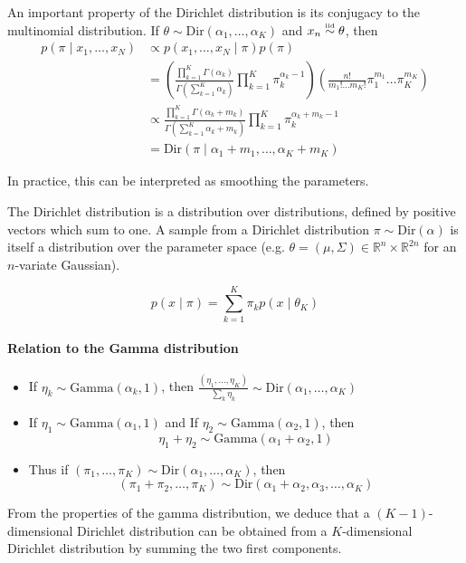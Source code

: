 \documentclass[twoside]{article}
\newcommand{\Dir}{\mathrm{Dir}}
\newcommand{\Gam}{\mathrm{Gamma}}
\newcommand\iid{\mathrel{\stackrel{\makebox[0pt]{\mbox{\normalfont\tiny iid}}}{\sim}}}
\begin{document}
An important property of the Dirichlet distribution is its conjugacy to the multinomial distribution. If $\theta \sim \Dir(\alpha_1,\ldots,\alpha_K)$ and $x_n \iid \theta$, then
\begin{align*}
  p(\pi \mid x_1, \dots, x_N)
  &\propto p(x_1, \dots, x_N \mid \pi) p(\pi) \\
  &= \left( \frac{\prod_{k=1}^{K} \Gamma{(\alpha_k)}}{\Gamma{(\sum_{k=1}^{K} \alpha_k)}} \prod_{k=1}^{K} \pi_{k}^{\alpha_k - 1} \right) \left( \frac{n!}{m_1! \ldots m_K!} \pi_1^{m_1} \ldots \pi_K^{m_K} \right) \\
  &\propto \frac{\prod_{k=1}^{K} \Gamma{(\alpha_k + m_k)}}{\Gamma{(\sum_{k=1}^{K} \alpha_k + m_k)}} \prod_{k=1}^{K} \pi_{k}^{\alpha_k + m_k - 1} \\
  &= \Dir(\pi \mid \alpha_1 + m_1, \dots, \alpha_K + m_K)
\end{align*}
 
In practice, this can be interpreted as smoothing the parameters.

The Dirichlet distribution is a distribution over distributions, defined by positive vectors which sum to one. A sample from a Dirichlet distribution $\pi \sim \Dir(\alpha)$ is itself a distribution over the parameter space (e.g. $\theta = (\mu, \Sigma) \in \mathbb{R}^n \times \mathbb{R}^{2n}$ for an $n$-variate Gaussian).

$$ p(x \mid \pi) = \sum_{k=1}^K \pi_k p(x \mid \theta_K) $$

\paragraph{Relation to the Gamma distribution}

\begin{itemize}
\item If $\eta_k \sim \Gam(\alpha_k, 1)$, then $\frac{(\eta_1,\ldots,\eta_K)}{\sum_k \eta_k} \sim \Dir(\alpha_1,\ldots,\alpha_K)$
\item If $\eta_1 \sim \Gam(\alpha_1, 1)$ and If $\eta_2 \sim \Gam(\alpha_2, 1)$, then
\[ \eta_1 +\eta_2 \sim \Gam(\alpha_1 + \alpha_2, 1) \]
\item Thus if $(\pi_1,\ldots,\pi_K) \sim \Dir(\alpha_1,\ldots,\alpha_K)$, then
\[ (\pi_1 + \pi_2,\ldots,\pi_K) \sim \Dir(\alpha_1 + \alpha_2, \alpha_3,\ldots,\alpha_K) \]
\end{itemize}

From the properties of the gamma distribution, we deduce that a $(K-1)$-dimensional Dirichlet distribution can be obtained from a $K$-dimensional Dirichlet distribution by summing the two first components.
\end{document}
